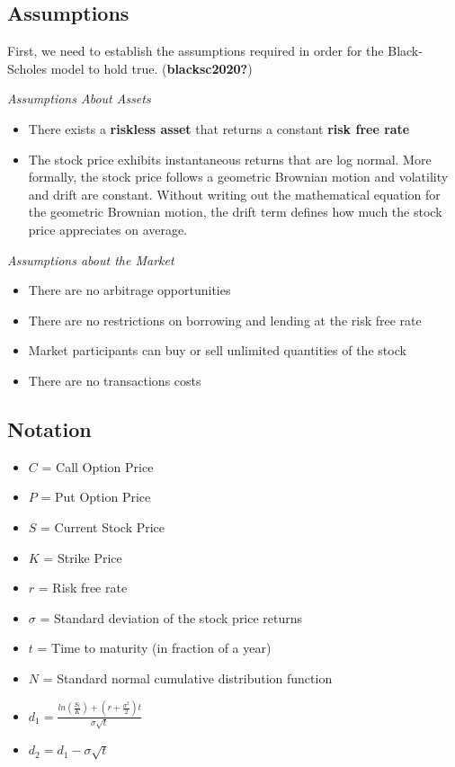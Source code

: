 \documentclass[
  letterpaper,
  DIV=11,
  numbers=noendperiod]{scrreprt}
\begin{document}
\subsection{Assumptions}\label{assumptions}

First, we need to establish the assumptions required in order for the
Black-Scholes model to hold true. (\textbf{blacksc2020?})

\emph{Assumptions About Assets}

\begin{itemize}
\item
  There exists a \textbf{riskless asset} that returns a constant
  \textbf{risk free rate}
\item
  The stock price exhibits instantaneous returns that are log normal.
  More formally, the stock price follows a geometric Brownian motion and
  volatility and drift are constant. Without writing out the
  mathematical equation for the geometric Brownian motion, the drift
  term defines how much the stock price appreciates on average.
\end{itemize}

\emph{Assumptions about the Market}

\begin{itemize}
\item
  There are no arbitrage opportunities
\item
  There are no restrictions on borrowing and lending at the risk free
  rate
\item
  Market participants can buy or sell unlimited quantities of the stock
\item
  There are no transactions costs
\end{itemize}

\subsection{Notation}\label{notation}

\begin{itemize}
\item
  \(C\) = Call Option Price
\item
  \(P\) = Put Option Price
\item
  \(S\) = Current Stock Price
\item
  \(K\) = Strike Price
\item
  \(r\) = Risk free rate
\item
  \(\sigma\) = Standard deviation of the stock price returns
\item
  \(t\) = Time to maturity (in fraction of a year)
\item
  \(N\) = Standard normal cumulative distribution function
\item
  \(d_{1} = \frac{ln(\frac{S_{t}}{K}) + (r + \frac{\sigma^{2}}{2})t}{\sigma \sqrt{t}}\)
\item
  \(d_{2} = d_{1} - \sigma \sqrt{t}\)
\end{itemize}
\end{document}
